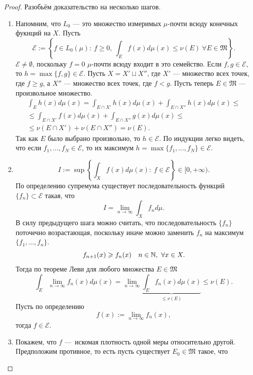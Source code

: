 \begin{proof}
    Разобьём доказательство на несколько шагов.
\begin{enumerate}
    \item Напомним, что $L_0$ — это множество измеримых $\mu$-почти всюду конечных фукнций на $X$. Пусть
    \[\mathcal{E}:= \left\{f \in L_0(\mu): \ f \geqslant 0, \ \int_E f(x)d\mu(x) \leqslant \nu(E) \ \forall E \in \mathfrak{M}\right\}.\]
    $\mathcal{E} \neq \emptyset$, поскольку $f = 0$ $\mu$-почти всюду входит в это семейство.
    Если $f,g \in \mathcal{E}$, то $h=\max\{f,g\} \in \mathcal{E}$.
    Пусть $X = X' \sqcup X''$, где $X'$ — множество всех точек, где $f \geqslant g$, а $X''$ — множество всех точек, где $f < g$.
    Пусть теперь $E \in \mathfrak{M}$ — произвольное множество.
    \begin{multline*}
        \int_E h(x) d\mu(x) 
        = \int_{E \cap X'} h(x) d\mu(x) + \int_{E \cap X''}h(x)d\mu(x)
        \leqslant\\\leqslant
        \int_{E \cap X'} f(x) d\mu(x) + \int_{E \cap X''}g(x)d\mu(x)
        \leqslant\\\leqslant
        \nu(E \cap X') + \nu(E \cap X'')
        = \nu(E).
    \end{multline*} 
    Так как $E$ было выбрано произвольно, то $h \in \mathcal{E}$.
    По индукции легко видеть, что если $f_1, \dots, f_N \in \mathcal{E}$, то их максимум $h = \max\{f_1, \dots, f_N\} \in \mathcal{E}$.
    \item \[I := \sup\left\{\int_X f(x)d\mu(x): \ f \in \mathcal{E}\right\} \in [0, +\infty).\]
    По определению супремума существует последовательность функций $\{f_n\} \subset \mathcal{E}$ такая, что 
    \[I = \lim\limits_{n\to \infty}\int_X f_n d\mu.\]
    В силу предыдущего шага можно считать, что последовательность $\{f_n\}$ поточечно возрастающая, поскольку иначе можно заменить $f_n$ на максимум $\{f_1, \dots, f_n\}$.
    \[f_{n+1}(x) \geqslant f_n(x) \quad n \in \mathbb{N}, \ \forall x \in X.\]
    Тогда по теореме Леви для любого множества $E \in \mathfrak{M}$
    \[\int_E \lim\limits_{n\to \infty}f_n(x)d\mu(x) = \lim\limits_{n\to \infty}\underbrace{\int_E f_n(x)d\mu(x)}_{\leqslant \nu(E)} \leqslant \nu(E).\]
    Пусть по определению
    \[f(x):=\lim\limits_{n\to \infty}f_n(x),\]
    тогда $f \in \mathcal{E}$.
    \item Покажем, что $f$ — искомая плотность одной меры относительно другой.
    Предположим противное, то есть пусть существует $E_0 \in \mathfrak{M}$ такое, что
    \begin{equation}

\end{equation}
\end{enumerate}
\end{proof}

